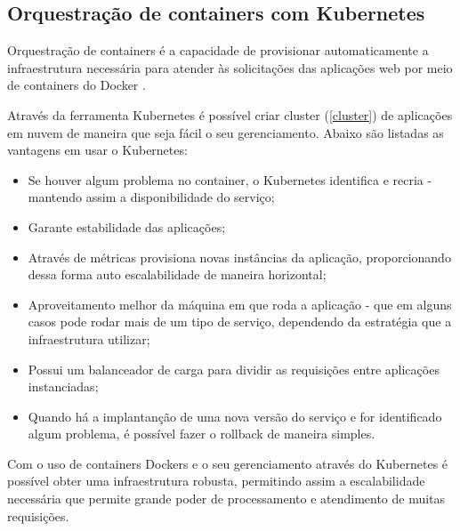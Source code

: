 \subsection{Orquestração de containers com Kubernetes}\label{kubernetes}

\begin{citacao}
Orquestração de containers é a capacidade de provisionar automaticamente
a infraestrutura necessária para atender às solicitações das aplicações web
por meio de containers do Docker \cite{docker-kubernetes-e-openshift}.
\end{citacao}

Através da ferramenta Kubernetes é possível criar cluster (\autoref{cluster})
de aplicações em nuvem de maneira que seja fácil o seu gerenciamento.
Abaixo são listadas as vantagens em usar o Kubernetes:

\begin{itemize}

	\item Se houver algum problema no container, o Kubernetes identifica e recria -
          mantendo assim a disponibilidade do serviço;
    \item Garante estabilidade das aplicações;
    \item Através de métricas provisiona novas instâncias da aplicação,
          proporcionando dessa forma auto escalabilidade de maneira horizontal;
    \item Aproveitamento melhor da máquina em que roda a aplicação - que em alguns
          casos pode rodar mais de um tipo de serviço, dependendo da estratégia
          que a infraestrutura utilizar;
    \item Possui um balanceador de carga para dividir as requisições entre
          aplicações instanciadas;
    \item Quando há a implantanção de uma nova versão do serviço e for identificado
          algum problema, é possível fazer o rollback de maneira simples.

\end{itemize}

Com o uso de containers Dockers e o seu gerenciamento através do Kubernetes é possível
obter uma infraestrutura robusta, permitindo assim a escalabilidade necessária que permite
grande poder de processamento e atendimento de muitas requisições.
